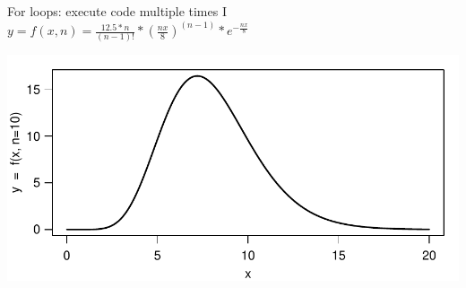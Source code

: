 \documentclass[xcolor=table,      handout ,    xcolor=dvipsnames]{beamer}\usepackage[]{graphicx}\usepackage[]{color}
\newenvironment{knitrout}{}{} %
\begin{document}
\begin{frame}[fragile]{For loops: execute code multiple times I}
\hspace{5em} $y = f(x, n) = \frac{12.5*n}{(n-1)!}*(\frac{n x}{8})^{(n-1)}*e^{-\frac{n x}{8}}$
\begin{knitrout}\footnotesize
{}\color{fgcolor}

{\centering \includegraphics[width=\textwidth]{./fig/for3a-1} 

}



\end{knitrout}

\end{frame}

\end{document}
